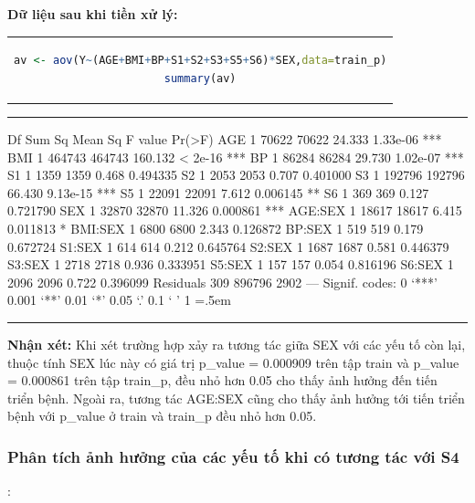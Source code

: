 \documentclass[runningheads]{llncs}
\newenvironment{lcverbatim}
 {\SaveVerbatim{cverb}}
 {\endSaveVerbatim
  \flushleft\fboxrule=0pt\fboxsep=.5em
  \colorbox{cverbbg}{%
    \makebox[\dimexpr\linewidth-2\fboxsep][l]{\BUseVerbatim{cverb}}%
  }
  \endflushleft
}
\begin{document}
\textbf{Dữ liệu sau khi tiền xử lý:}
\begin{center}
\begin{tabular}{c}
\begin{lstlisting}[language=R]
av <- aov(Y~(AGE+BMI+BP+S1+S2+S3+S5+S6)*SEX,data=train_p)
summary(av)
\end{lstlisting}
\end{tabular}
\end{center}
\hrule
\begin{lcverbatim}
             Df Sum Sq Mean Sq F value   Pr(>F)    
AGE           1  70622   70622  24.333 1.33e-06 ***
BMI           1 464743  464743 160.132  < 2e-16 ***
BP            1  86284   86284  29.730 1.02e-07 ***
S1            1   1359    1359   0.468 0.494335    
S2            1   2053    2053   0.707 0.401000    
S3            1 192796  192796  66.430 9.13e-15 ***
S5            1  22091   22091   7.612 0.006145 ** 
S6            1    369     369   0.127 0.721790    
SEX           1  32870   32870  11.326 0.000861 ***
AGE:SEX       1  18617   18617   6.415 0.011813 *  
BMI:SEX       1   6800    6800   2.343 0.126872    
BP:SEX        1    519     519   0.179 0.672724    
S1:SEX        1    614     614   0.212 0.645764    
S2:SEX        1   1687    1687   0.581 0.446379    
S3:SEX        1   2718    2718   0.936 0.333951    
S5:SEX        1    157     157   0.054 0.816196    
S6:SEX        1   2096    2096   0.722 0.396099    
Residuals   309 896796    2902                     
---
Signif. codes:  0 ‘***’ 0.001 ‘**’ 0.01 ‘*’ 0.05 ‘.’ 0.1 ‘ ’ 1
\end{lcverbatim}
\hrule
\vspace{0.5cm}

\textbf{Nhận xét:}
Khi xét trường hợp xảy ra tương tác giữa SEX với các yếu tố còn lại, thuộc tính SEX lúc này có giá trị  p\_value = 0.000909 trên tập train và p\_value = 0.000861 trên tập train\_p, đều nhỏ hơn 0.05 cho thấy ảnh hưởng đến tiến triển bệnh. Ngoài ra, tương tác AGE:SEX cũng cho thấy ảnh hưởng tới tiến triển bệnh với p\_value ở train và train\_p đều nhỏ hơn 0.05.


\subsubsection{Phân tích ảnh hưởng của các yếu tố khi có tương tác với S4}:
\vspace{0.5cm}
\end{document}
